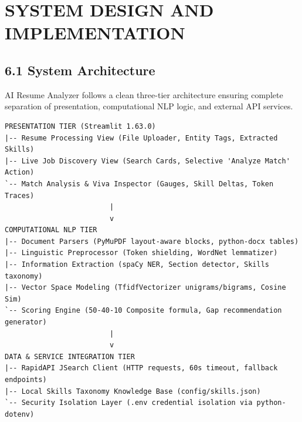 \documentclass[11pt,a4paper]{article}
\begin{document}
\newpage

\section{SYSTEM DESIGN AND IMPLEMENTATION}

\subsection{6.1 System Architecture}
AI Resume Analyzer follows a clean three-tier architecture ensuring complete separation of presentation, computational NLP logic, and external API services.

\begin{center}
\begin{minipage}{0.95\textwidth}
\begin{lstlisting}
PRESENTATION TIER (Streamlit 1.63.0)
|-- Resume Processing View (File Uploader, Entity Tags, Extracted Skills)
|-- Live Job Discovery View (Search Cards, Selective 'Analyze Match' Action)
`-- Match Analysis & Viva Inspector (Gauges, Skill Deltas, Token Traces)
                         |
                         v
COMPUTATIONAL NLP TIER
|-- Document Parsers (PyMuPDF layout-aware blocks, python-docx tables)
|-- Linguistic Preprocessor (Token shielding, WordNet lemmatizer)
|-- Information Extraction (spaCy NER, Section detector, Skills taxonomy)
|-- Vector Space Modeling (TfidfVectorizer unigrams/bigrams, Cosine Sim)
`-- Scoring Engine (50-40-10 Composite formula, Gap recommendation generator)
                         |
                         v
DATA & SERVICE INTEGRATION TIER
|-- RapidAPI JSearch Client (HTTP requests, 60s timeout, fallback endpoints)
|-- Local Skills Taxonomy Knowledge Base (config/skills.json)
`-- Security Isolation Layer (.env credential isolation via python-dotenv)
\end{lstlisting}
\end{minipage}
\end{center}
\end{document}
